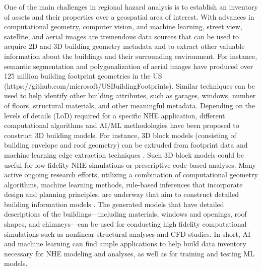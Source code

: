 One of the main challenges in regional hazard analysis is to establish an inventory of assets and their properties over a geospatial area of interest. With advances in computational geometry, computer vision, and machine learning, street view, satellite, and aerial images are tremendous data sources that can be used to acquire 2D and 3D building geometry metadata and to extract other valuable information about the buildings and their surrounding environment. For instance, semantic segmentation and polygonalization of aerial images have produced over 125 million building footprint geometries in the US (https://github.com/microsoft/USBuildingFootprints). Similar techniques can be used to help identify other building attributes, such as garages, windows, number of floors, structural materials, and other meaningful metadata. Depending on the levels of details (LoD) required for a specific NHE application, different computational algorithms and AI/ML methodologies have been proposed to construct 3D building models. For instance, 3D block models (consisting of building envelope and roof geometry) can be extruded from footprint data and machine learning edge extraction techniques \citep{maninis2017convolutional,yu2017casenet}. Such 3D block models could be useful for low fidelity NHE simulations or prescriptive code-based analyses. Many active ongoing research efforts, utilizing a combination of computational geometry algorithms, machine learning methods, rule-based inferences that incorporate design and planning principles, are underway that aim to construct detailed building information models \citep{martinovic20153d,chen2018automatic}. The generated models that have detailed descriptions of the buildings—including materials, windows and openings, roof shapes, and chimneys—can be used for conducting high fidelity computational simulations such as nonlinear structural analyses and CFD studies. In short, AI and machine learning can find ample applications to help build data inventory necessary for NHE modeling and analyses, as well as for training and testing ML models. 

